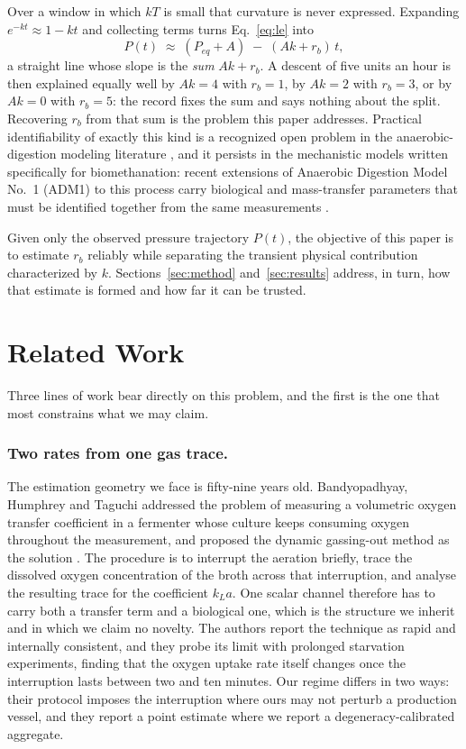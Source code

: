 \documentclass[runningheads]{llncs}
\newcommand{\rb}{\ensuremath{r_{b}}}
\begin{document}
Over a window in which $kT$ is small that curvature is never expressed.
Expanding $e^{-kt}\approx 1-kt$ and collecting terms turns
Eq.~\eqref{eq:le} into
\begin{equation}
P(t)\;\approx\;(P_{eq}+A)\;-\;(Ak+\rb)\,t ,
\label{eq:degen}
\end{equation}
a straight line whose slope is the \emph{sum} $Ak+\rb$. A descent of
five units an hour is then explained equally well by $Ak=4$ with
$\rb=1$, by $Ak=2$ with $\rb=3$, or by $Ak=0$ with $\rb=5$: the record
fixes the sum and says nothing about the split. Recovering $\rb$ from
that sum is the problem this paper addresses. Practical
identifiability of exactly this kind
is a recognized open problem in the anaerobic-digestion modeling
literature \cite{donosobravo2011model}, and it persists in the
mechanistic models written specifically for biomethanation: recent
extensions of Anaerobic Digestion Model No.~1 (ADM1) to this process
carry biological and mass-transfer
parameters that must be identified together from the same measurements
\cite{acostapavas2023dynamic}.

Given only the observed pressure trajectory $P(t)$, the objective of
this paper is to estimate \rb{} reliably while separating the transient
physical contribution characterized by $k$. Sections~\ref{sec:method}
and~\ref{sec:results} address, in turn, how that estimate is formed and
how far it can be trusted.

\section{Related Work}
\label{sec:related}

Three lines of work bear directly on this problem, and the first is the
one that most constrains what we may claim.

\subsubsection{Two rates from one gas trace.}
The estimation geometry we face is fifty-nine years old.
Bandyopadhyay, Humphrey and Taguchi addressed the problem of measuring
a volumetric oxygen transfer coefficient in a fermenter whose culture
keeps consuming oxygen throughout the measurement, and proposed the
dynamic gassing-out method as the
solution \cite{bandyopadhyay1967dynamic}. The procedure is to interrupt
the aeration briefly, trace the dissolved oxygen concentration of the
broth across that interruption, and analyse the resulting trace for
the coefficient $k_{L}a$. One scalar channel therefore has to carry both a transfer
term and a biological one, which is the structure we inherit and in
which we claim no novelty. The authors report the technique as rapid
and internally consistent, and they probe its limit with prolonged
starvation experiments, finding that the oxygen uptake rate itself
changes once the interruption lasts between two and ten minutes. Our
regime differs in two ways: their protocol imposes the interruption
where ours may not perturb a production vessel, and they report a point
estimate where we report a degeneracy-calibrated aggregate.
\end{document}
